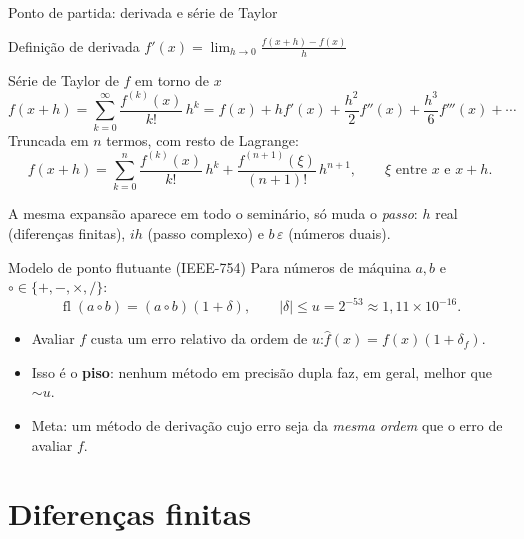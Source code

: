 \documentclass[aspectratio=169,11pt]{beamer}
\newcommand{\fl}{\operatorname{fl}}
\begin{document}
\begin{frame}{Ponto de partida: derivada e série de Taylor}
  \begin{block}{Definição de derivada}
    \centering
    $\displaystyle f'(x) = \lim_{h\to0}\frac{f(x+h)-f(x)}{h}$
  \end{block}
  \begin{block}{Série de Taylor de $f$ em torno de $x$}
    \[
      f(x+h) = \sum_{k=0}^{\infty}\frac{f^{(k)}(x)}{k!}\,h^k
      = f(x) + hf'(x) + \frac{h^2}{2}f''(x) + \frac{h^3}{6}f'''(x) + \cdots
    \]
    Truncada em $n$ termos, com resto de Lagrange:
    \[
      f(x+h) = \sum_{k=0}^{n}\frac{f^{(k)}(x)}{k!}\,h^k + \frac{f^{(n+1)}(\xi)}{(n+1)!}\,h^{n+1},\qquad \xi\text{ entre } x \text{ e } x+h.
    \]
  \end{block}
  {\small A mesma expansão aparece em todo o seminário, só muda o \emph{passo}:
  $h$ real (diferenças finitas), $ih$ (passo complexo) e $b\,\varepsilon$ (números duais).}
\end{frame}

\begin{frame}{Modelo de ponto flutuante (IEEE-754)}
  Para números de máquina $a,b$ e $\circ\in\{+,-,\times,/\}$:
  \[
    \fl(a\circ b) = (a\circ b)(1+\delta),\qquad |\delta|\le u = 2^{-53}\approx 1{,}11\times10^{-16}.
  \]
  \begin{itemize}
    \item Avaliar $f$ custa um erro relativo da ordem de $u$:\quad $\hat f(x) = f(x)(1+\delta_f)$.
    \item Isso é o \textbf{piso}: nenhum método em precisão dupla faz, em geral, melhor que $\sim u$.
    \item Meta: um método de derivação cujo erro seja da \emph{mesma ordem} que o erro de avaliar $f$.
  \end{itemize}
\end{frame}

\section{Diferenças finitas}
\end{document}
